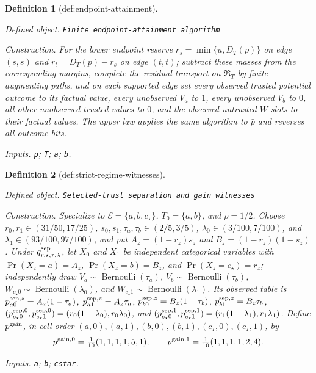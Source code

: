 \documentclass{article}
\newtheorem{definition}{Definition}
\begin{document}
\begin{definition}[def:endpoint-attainment]\label{def:endpoint-attainment}
\par\smallskip\noindent\emph{Defined object.} \texttt{Finite endpoint-\allowbreak{}attainment algorithm}
\par\smallskip\noindent\emph{Construction.} For the lower endpoint reserve \(r_s=\min\{u,D_T(p)\}\) on edge \((s,s)\) and \(r_t=D_T(p)-r_s\) on edge \((t,t)\); subtract these masses from the corresponding margins, complete the residual transport on \(\mathfrak R_T\) by finite augmenting paths, and on each supported edge set every observed trusted potential outcome to its factual value, every unobserved \(V_a\) to \(1\), every unobserved \(V_b\) to \(0\), all other unobserved trusted values to \(0\), and the observed untrusted \(W\)-slots to their factual values. The upper law applies the same algorithm to \(\bar p\) and reverses all outcome bits.
\par\smallskip\noindent\emph{Inputs.} \texttt{p}; \texttt{T}; \texttt{a}; \texttt{b}.
\end{definition}

\begin{definition}[def:strict-regime-witnesses]\label{def:strict-regime-witnesses}
\par\smallskip\noindent\emph{Defined object.} \texttt{Selected-\allowbreak{}trust separation and gain witnesses}
\par\smallskip\noindent\emph{Construction.} Specialize to \(\mathcal E=\{a,b,c_\star\}\), \(T_0=\{a,b\}\), and \(\rho=1/2\). Choose \(r_0,r_1\in(31/50,17/25)\), \(s_0,s_1,\tau_a,\tau_b\in(2/5,3/5)\), \(\lambda_0\in(3/100,7/100)\), and \(\lambda_1\in(93/100,97/100)\), and put \(A_z=(1-r_z)s_z\) and \(B_z=(1-r_z)(1-s_z)\). Under \(q^{\rm sep}_{r,s,\tau,\lambda}\), let \(X_0\) and \(X_1\) be independent categorical variables with \(\Pr(X_z=a)=A_z\), \(\Pr(X_z=b)=B_z\), and \(\Pr(X_z=c_\star)=r_z\); independently draw \(V_a\sim\operatorname{Bernoulli}(\tau_a)\), \(V_b\sim\operatorname{Bernoulli}(\tau_b)\), \(W_{c_\star0}\sim\operatorname{Bernoulli}(\lambda_0)\), and \(W_{c_\star1}\sim\operatorname{Bernoulli}(\lambda_1)\). Its observed table is \(p^{{\rm sep},z}_{a0}=A_z(1-\tau_a)\), \(p^{{\rm sep},z}_{a1}=A_z\tau_a\), \(p^{{\rm sep},z}_{b0}=B_z(1-\tau_b)\), \(p^{{\rm sep},z}_{b1}=B_z\tau_b\), \((p^{{\rm sep},0}_{c_\star0},p^{{\rm sep},0}_{c_\star1})=(r_0(1-\lambda_0),r_0\lambda_0)\), and \((p^{{\rm sep},1}_{c_\star0},p^{{\rm sep},1}_{c_\star1})=(r_1(1-\lambda_1),r_1\lambda_1)\). Define \(p^{\rm gain}\), in cell order \((a,0),(a,1),(b,0),(b,1),(c_\star,0),(c_\star,1)\), by \[p^{{\rm gain},0}=\tfrac1{10}(1,1,1,1,5,1),\qquad p^{{\rm gain},1}=\tfrac1{10}(1,1,1,1,2,4).\]
\par\smallskip\noindent\emph{Inputs.} \texttt{a}; \texttt{b}; \texttt{cstar}.
\end{definition}
\end{document}

